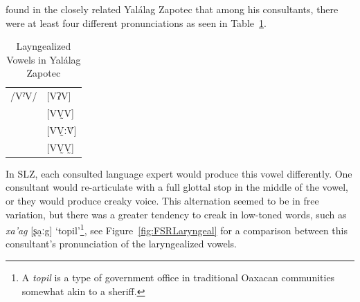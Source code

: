 \documentclass[12pt, letterpaper]{article}
\providecommand{\lsptoprule}{\midrule\toprule}
\providecommand{\lspbottomrule}{\bottomrule\midrule}
\begin{document}
\citet{avelinoAcousticElectroglottographicAnalyses2010} found in the closely related Yalálag Zapotec that among his consultants, there were at least four different pronunciations as seen in Table~\ref{tab:laryngeal}. 
\begin{table}[!h]
	\centering
	\caption{Layngealized Vowels in Yalálag Zapotec}
	\label{tab:laryngeal}
	 \begin{tabular}{ll}
	\lsptoprule
	/VˀV/	&  [VʔV]  \\
			&  [VV̰V]   \\
			&  [VV̰ːV̆]  \\
			&  [VV̰V̰]	\\
	\lspbottomrule
	\end{tabular}
\end{table}
In SLZ, each consulted language expert would produce this vowel differently. One consultant would re-articulate with a full glottal stop in the middle of the vowel, or they would produce creaky voice. This alternation seemed to be in free variation, but there was a greater tendency to creak in low-toned words, such as \textit{xa'ag} [ʂa̰ːg] `topil'\footnote{A \textit{topil} is a type of government office in traditional Oaxacan communities somewhat akin to a sheriff.}, see Figure~\ref{fig:FSRLaryngeal} for a comparison between this consultant's pronunciation of the laryngealized vowels.
\end{document}
